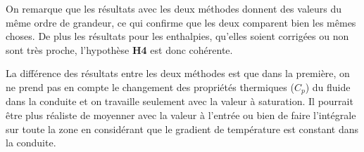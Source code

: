 On remarque que les résultats avec les deux méthodes donnent des valeurs du même ordre de grandeur, ce qui confirme que les deux comparent bien les mêmes choses. De plus les résultats pour les enthalpies, qu'elles soient corrigées ou non sont très proche, l'hypothèse \textbf{H4} est donc cohérente.\\ \par

La différence des résultats entre les deux méthodes est que dans la première, on ne prend pas en compte le changement des propriétés thermiques ($C_p$) du fluide dans la conduite et on travaille seulement avec la valeur à saturation. Il pourrait être plus réaliste de moyenner avec la valeur à l'entrée ou bien de faire l'intégrale sur toute la zone en considérant que le gradient de température est constant dans la conduite.